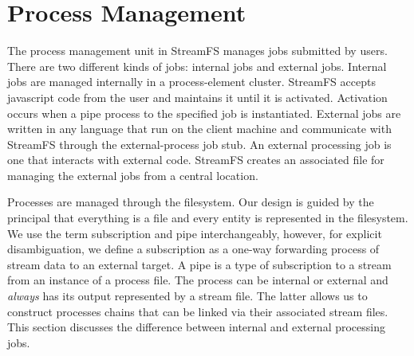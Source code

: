 \section{Process Management}
\label{sec:promngt}

The process management unit in StreamFS manages jobs submitted by users.  There are two different kinds of jobs: internal
jobs and external jobs.  Internal jobs are managed internally in a process-element cluster.  StreamFS accepts javascript code
from the user and maintains it until it is activated.  Activation occurs when a pipe process to the specified job
is instantiated.  External jobs are written in any language that run on the client machine and communicate with StreamFS
through the external-process job stub.  An external processing job
is one that interacts with external code.  StreamFS creates an associated file for managing 
the external jobs from a central location.

Processes are managed through the filesystem.  Our design is guided by the principal that everything is a file and
every entity is represented in the filesystem.  We use the term subscription and pipe interchangeably, however, for 
explicit disambiguation, we define a subscription as a one-way forwarding process of stream data to an external
target.  A pipe is a type of subscription to a stream from an instance of a process file.  The process can
be internal or external and \emph{always} has its output represented by a stream file.  The latter allows us
to construct processes chains that can be linked via their associated stream files.
This section discusses the difference between internal and external processing jobs.  
